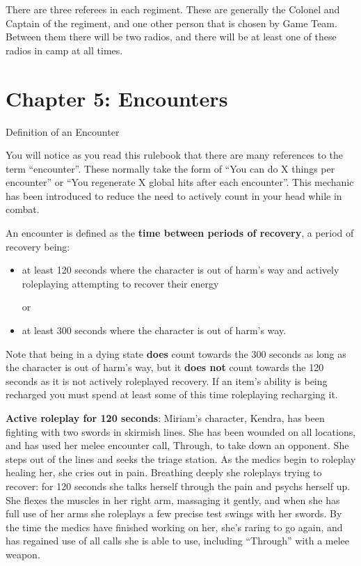 There are three referees in each regiment. These are generally the Colonel and Captain of the regiment, and one other person that is chosen by Game Team. Between them there will be two radios, and there will be at least one of these radios in camp at all times.

\chapter{Chapter 5: Encounters}

Definition of an Encounter

You will notice as you read this rulebook that there are many references to the term ``encounter''. These normally take the form of ``You can do X things per encounter'' or ``You regenerate X global hits after each encounter''. This mechanic has been introduced to reduce the need to actively count in your head while in combat.

An encounter is defined as the \textbf{time between periods of recovery}, a period of recovery being:

\begin{itemize}
\item at least 120 seconds where the character is out of harm's way and actively roleplaying attempting to recover their energy

or

\item at least 300 seconds where the character is out of harm's way.

\end{itemize}
Note that being in a dying state \textbf{does} count towards the 300 seconds as long as the character is out of harm's way, but it \textbf{does not} count towards the 120 seconds as it is not actively roleplayed recovery. If an item's ability is being recharged you must spend at least some of this time roleplaying recharging it.

\textbf{Active roleplay for 120 seconds}: Miriam's character, Kendra, has been fighting with two swords in skirmish lines. She has been wounded on all locations, and has used her melee encounter call, Through, to take down an opponent. She steps out of the lines and seeks the triage station. As the medics begin to roleplay healing her, she cries out in pain. Breathing deeply she roleplays trying to recover: for 120 seconds she talks herself through the pain and psychs herself up. She flexes the muscles in her right arm, massaging it gently, and when she has full use of her arms she roleplays a few precise test swings with her swords. By the time the medics have finished working on her, she's raring to go again, and has regained use of all calls she is able to use, including ``Through'' with a melee weapon.

